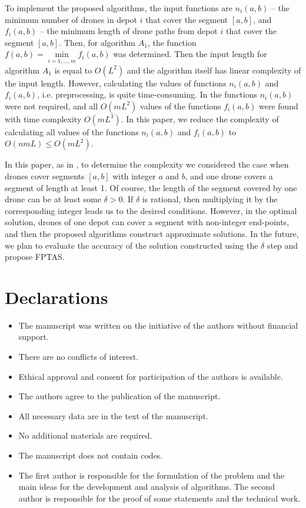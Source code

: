 \documentclass[runningheads]{llncs}
\begin{document}
To implement the proposed algorithms, the input functions are $n_i(a,b)$ -- the minimum number of drones in depot $i$ that cover the segment $[a,b]$, and $f_i(a,b)$ -- the minimum length of drone paths from depot $i$ that cover the segment $[a,b]$. Then, for algorithm $A_1$, the function $f(a,b)=\min\limits_{i=1,\ldots,m} f_i(a,b)$ was determined. Then the input length for algorithm $A_1$ is equal to $O(L^2)$ and the algorithm itself has linear complexity of the input length. However, calculating the values of functions $n_i(a,b)$ and $f_i(a,b)$, i.e. preprocessing, is quite time-consuming. In \cite{ErShad24} the functions $n_i(a,b)$ were not required, and all $O(mL^2)$ values of the functions $f_i(a,b)$ were found with time complexity $O(mL^3)$. In this paper, we reduce the complexity of calculating all values of the functions $n_i(a,b)$ and $f_i(a,b)$ to $O(nmL)\leq O(mL^2)$.

In this paper, as in \cite{ErShad24}, to determine the complexity we considered the case when drones cover segments $[a,b]$ with integer $a$ and $b$, and one drone covers a segment of length at least 1. Of course, the length of the segment covered by one drone can be at least some $\delta>0$. If $\delta$ is rational, then multiplying it by the corresponding integer leads us to the desired conditions. However, in the optimal solution, drones of one depot can cover a segment with non-integer end-points, and then the proposed algorithms construct approximate solutions. In the future, we plan to evaluate the accuracy of the solution constructed using the $\delta$ step and propose FPTAS.

\section*{Declarations}
\begin{itemize}
\item The manuscript was written on the initiative of the authors without financial support.
\item There are no conflicts of interest.
\item Ethical approval and consent for participation of the authors is available.
\item The authors agree to the publication of the manuscript.
\item All necessary data are in the text of the manuscript.
\item No additional materials are required.
\item The manuscript does not contain codes.
\item The first author is responsible for the formulation of the problem and the main ideas for the development and analysis of algorithms. The second author is responsible for the proof of some statements and the technical work.
\end{itemize}
\end{document}
